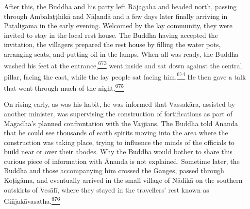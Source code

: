 After this, the Buddha and his party left Rājagaha and headed north,
passing through Ambalaṭṭhikā and Nāḷandā and a few days later finally
arriving in Pāṭaligāma in the early evening. Welcomed by the lay
community, they were invited to stay in the local rest house. The Buddha
having accepted the invitation, the villagers prepared the rest house by
filling the water pots, arranging seats, and putting oil in the lamps.
When all was ready, the Buddha washed his feet at the
entrance,\label{footprints_split_017.html_fnref673}\hyperref[footprints_split_025.htmlux5cux23fn673]{\textsuperscript{673}}
went inside and sat down against the central pillar, facing the east,
while the lay people sat facing
him.\label{footprints_split_017.html_fnref674}\hyperref[footprints_split_025.htmlux5cux23fn674]{\textsuperscript{674}}
He then gave a talk that went through much of the
night.\label{footprints_split_017.html_fnref675}\hyperref[footprints_split_025.htmlux5cux23fn675]{\textsuperscript{675}}

On rising early, as was his habit, he was informed that Vassakāra,
assisted by another minister, was supervising the construction of
fortifications as part of Magadha's planned confrontation with the
Vajjians. The Buddha told Ānanda that he could see thousands of earth
spirits moving into the area where the construction was taking place,
trying to influence the minds of the officials to build near or over
their abodes. Why the Buddha would bother to share this curious piece of
information with Ānanda is not explained. Sometime later, the Buddha and
those accompanying him crossed the Ganges, passed through Koṭigāma, and
eventually arrived in the small village of Nādikā on the southern
outskirts of Vesālī, where they stayed in the travellers' rest known as
Giñjakāvasatha.\label{footprints_split_017.html_fnref676}\hyperref[footprints_split_025.htmlux5cux23fn676]{\textsuperscript{676}}

